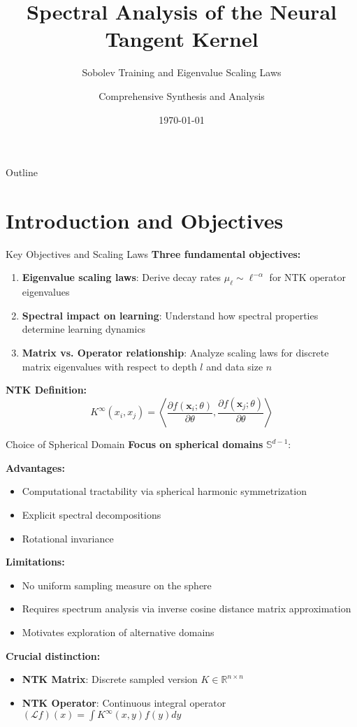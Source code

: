 \documentclass{beamer}
\title{Spectral Analysis of the Neural Tangent Kernel}
\subtitle{Sobolev Training and Eigenvalue Scaling Laws}
\author{Comprehensive Synthesis and Analysis}
\date{\today}
\begin{document}
\begin{frame}
\titlepage
\end{frame}

\begin{frame}{Outline}
\tableofcontents
\end{frame}

\section{Introduction and Objectives}

\begin{frame}{Key Objectives and Scaling Laws}
\textbf{Three fundamental objectives:}
\begin{enumerate}
\item \textbf{Eigenvalue scaling laws}: Derive decay rates $\mu_\ell \sim \ell^{-\alpha}$ for NTK operator eigenvalues
\item \textbf{Spectral impact on learning}: Understand how spectral properties determine learning dynamics
\item \textbf{Matrix vs. Operator relationship}: Analyze scaling laws for discrete matrix eigenvalues with respect to depth $l$ and data size $n$
\end{enumerate}

\textbf{NTK Definition:}
$$K^{\infty}(x_i, x_j) = \left\langle \frac{\partial f(\mathbf{x}_i; \theta)}{\partial \theta}, \frac{\partial f(\mathbf{x}_j; \theta)}{\partial \theta} \right\rangle$$
\end{frame}

\begin{frame}{Choice of Spherical Domain}
\textbf{Focus on spherical domains} $\mathbb{S}^{d-1}$:

\textbf{Advantages:}
\begin{itemize}
\item Computational tractability via spherical harmonic symmetrization
\item Explicit spectral decompositions
\item Rotational invariance
\end{itemize}

\textbf{Limitations:}
\begin{itemize}
\item No uniform sampling measure on the sphere
\item Requires spectrum analysis via inverse cosine distance matrix approximation
\item Motivates exploration of alternative domains
\end{itemize}

\textbf{Crucial distinction:}
\begin{itemize}
\item \textbf{NTK Matrix}: Discrete sampled version $K \in \mathbb{R}^{n \times n}$
\item \textbf{NTK Operator}: Continuous integral operator $(\mathcal{L}f)(x) = \int K^{\infty}(x,y)f(y)dy$
\end{itemize}
\end{frame}
\end{document}
